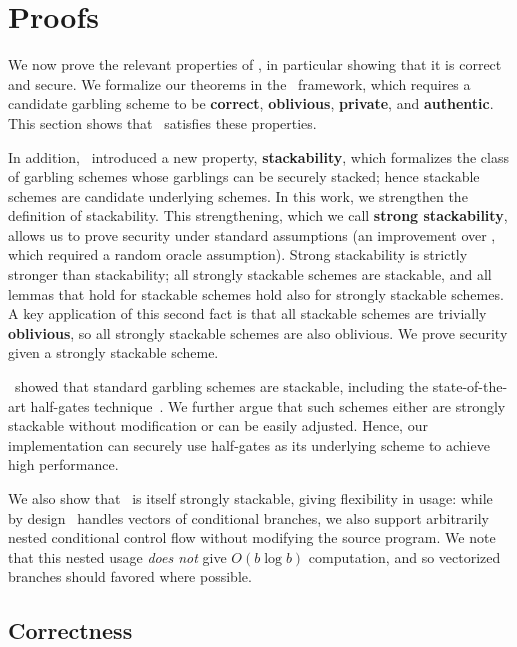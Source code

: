 \section{Proofs}\label{sec:proof}

We now prove the relevant properties of \ourscheme, in particular
showing that it is correct and secure.
We formalize our theorems in the~\cite{CCS:BelHoaRog12} framework,
which requires a candidate garbling scheme to be \textbf{correct},
\textbf{oblivious}, \textbf{private}, and \textbf{authentic}.
This section shows that \ourscheme\ satisfies these properties.

In addition, \HK\ introduced a new property, \textbf{stackability}, which
formalizes the class of garbling schemes whose garblings can be
securely stacked; hence stackable schemes are candidate underlying
schemes.
%
In this work, we strengthen the definition of stackability.  This
strengthening, which we call \textbf{strong stackability}, allows us to
prove security under standard assumptions (an improvement over \HK,
which required a random oracle assumption).
Strong stackability is strictly stronger than stackability; all
strongly
stackable schemes are stackable,
and all lemmas that hold for stackable schemes hold also for strongly
stackable schemes.
A key application of this second fact is that all stackable schemes
are trivially \textbf{oblivious}, so all strongly stackable schemes are
also oblivious.
We prove security given a strongly stackable scheme.

\HK\ showed that standard garbling schemes are stackable, including
the state-of-the-art half-gates technique~\cite{EC:ZahRosEva15}.
We further argue that such schemes either are strongly stackable without
modification or can be easily adjusted.
Hence, our implementation can securely use half-gates as its underlying
scheme to achieve high performance.

We also show that \ourscheme\ is itself strongly stackable, giving
flexibility in usage: while by design \ourscheme\ handles vectors
of conditional branches, we also support arbitrarily nested
conditional control flow without modifying the source program.
%
We note that this nested usage \emph{does not} give $O(b\log b)$
computation, and so vectorized branches should favored where possible.



\subsection{Correctness}\label{sec:correctness}

